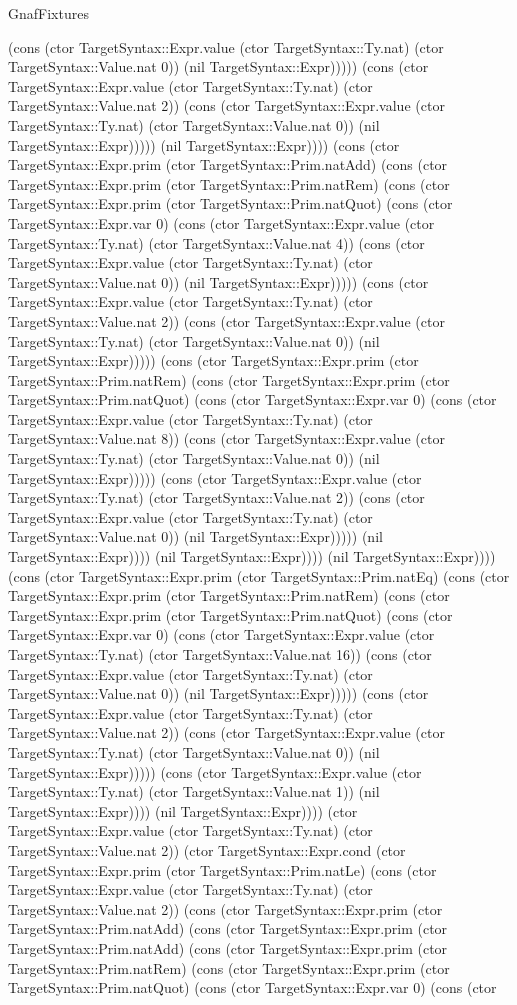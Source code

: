 \begin{lexlean}{GnafFixtures}
\begin{semanticmodule}
{(cons (ctor TargetSyntax::Expr.value (ctor TargetSyntax::Ty.nat) (ctor TargetSyntax::Value.nat 0)) (nil TargetSyntax::Expr))))) (cons (ctor TargetSyntax::Expr.value (ctor TargetSyntax::Ty.nat) (ctor TargetSyntax::Value.nat 2)) (cons (ctor TargetSyntax::Expr.value (ctor TargetSyntax::Ty.nat) (ctor TargetSyntax::Value.nat 0)) (nil TargetSyntax::Expr))))) (nil TargetSyntax::Expr)))) (cons (ctor TargetSyntax::Expr.prim (ctor TargetSyntax::Prim.natAdd) (cons (ctor TargetSyntax::Expr.prim (ctor TargetSyntax::Prim.natRem) (cons (ctor TargetSyntax::Expr.prim (ctor TargetSyntax::Prim.natQuot) (cons (ctor TargetSyntax::Expr.var 0) (cons (ctor TargetSyntax::Expr.value (ctor TargetSyntax::Ty.nat) (ctor TargetSyntax::Value.nat 4)) (cons (ctor TargetSyntax::Expr.value (ctor TargetSyntax::Ty.nat) (ctor TargetSyntax::Value.nat 0)) (nil TargetSyntax::Expr))))) (cons (ctor TargetSyntax::Expr.value (ctor TargetSyntax::Ty.nat) (ctor TargetSyntax::Value.nat 2)) (cons (ctor TargetSyntax::Expr.value (ctor TargetSyntax::Ty.nat) (ctor TargetSyntax::Value.nat 0)) (nil TargetSyntax::Expr))))) (cons (ctor TargetSyntax::Expr.prim (ctor TargetSyntax::Prim.natRem) (cons (ctor TargetSyntax::Expr.prim (ctor TargetSyntax::Prim.natQuot) (cons (ctor TargetSyntax::Expr.var 0) (cons (ctor TargetSyntax::Expr.value (ctor TargetSyntax::Ty.nat) (ctor TargetSyntax::Value.nat 8)) (cons (ctor TargetSyntax::Expr.value (ctor TargetSyntax::Ty.nat) (ctor TargetSyntax::Value.nat 0)) (nil TargetSyntax::Expr))))) (cons (ctor TargetSyntax::Expr.value (ctor TargetSyntax::Ty.nat) (ctor TargetSyntax::Value.nat 2)) (cons (ctor TargetSyntax::Expr.value (ctor TargetSyntax::Ty.nat) (ctor TargetSyntax::Value.nat 0)) (nil TargetSyntax::Expr))))) (nil TargetSyntax::Expr)))) (nil TargetSyntax::Expr)))) (nil TargetSyntax::Expr)))) (cons (ctor TargetSyntax::Expr.prim (ctor TargetSyntax::Prim.natEq) (cons (ctor TargetSyntax::Expr.prim (ctor TargetSyntax::Prim.natRem) (cons (ctor TargetSyntax::Expr.prim (ctor TargetSyntax::Prim.natQuot) (cons (ctor TargetSyntax::Expr.var 0) (cons (ctor TargetSyntax::Expr.value (ctor TargetSyntax::Ty.nat) (ctor TargetSyntax::Value.nat 16)) (cons (ctor TargetSyntax::Expr.value (ctor TargetSyntax::Ty.nat) (ctor TargetSyntax::Value.nat 0)) (nil TargetSyntax::Expr))))) (cons (ctor TargetSyntax::Expr.value (ctor TargetSyntax::Ty.nat) (ctor TargetSyntax::Value.nat 2)) (cons (ctor TargetSyntax::Expr.value (ctor TargetSyntax::Ty.nat) (ctor TargetSyntax::Value.nat 0)) (nil TargetSyntax::Expr))))) (cons (ctor TargetSyntax::Expr.value (ctor TargetSyntax::Ty.nat) (ctor TargetSyntax::Value.nat 1)) (nil TargetSyntax::Expr)))) (nil TargetSyntax::Expr)))) (ctor TargetSyntax::Expr.value (ctor TargetSyntax::Ty.nat) (ctor TargetSyntax::Value.nat 2)) (ctor TargetSyntax::Expr.cond (ctor TargetSyntax::Expr.prim (ctor TargetSyntax::Prim.natLe) (cons (ctor TargetSyntax::Expr.value (ctor TargetSyntax::Ty.nat) (ctor TargetSyntax::Value.nat 2)) (cons (ctor TargetSyntax::Expr.prim (ctor TargetSyntax::Prim.natAdd) (cons (ctor TargetSyntax::Expr.prim (ctor TargetSyntax::Prim.natAdd) (cons (ctor TargetSyntax::Expr.prim (ctor TargetSyntax::Prim.natRem) (cons (ctor TargetSyntax::Expr.prim (ctor TargetSyntax::Prim.natQuot) (cons (ctor TargetSyntax::Expr.var 0) (cons (ctor }
\end{semanticmodule}
\end{lexlean}
